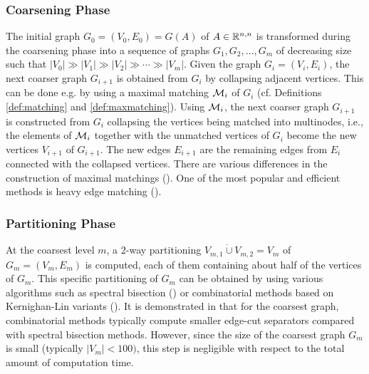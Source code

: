\subsubsection*{Coarsening Phase}
The initial graph $G_0=(V_0,E_0)=G(A)$ of $A\in\mathbb{R}^{n,n}$ is transformed during
the coarsening phase
into a sequence of graphs $G_1, G_2, \ldots, G_m$ of decreasing size 
such that $|V_0|\gg|V_1|\gg|V_2|\gg\cdots\gg|V_m|$. 
Given the graph $G_i=(V_i,E_i)$, the
next coarser graph $G_{i+1}$ is  obtained from $G_i$ by collapsing adjacent
vertices. This can be done e.g. by using a maximal matching $\mathcal{M}_i$ of $G_i$ (cf. Definitions \ref{def:matching} and \ref{def:maxmatching}).
Using $\mathcal{M}_i$, the next  coarser graph $G_{i+1}$ is 
constructed from $G_i$ collapsing the vertices 
being matched into multinodes, i.e., the elements of  $\mathcal{M}_i$ together with the
unmatched vertices of $G_i$ become the new vertices $V_{i+1}$ of $G_{i+1}$. 
The new edges $E_{i+1}$ are the remaining edges from $E_i$ 
connected with the collapsed vertices. 
There are various differences in the construction of maximal matchings
(\cite{karypis:98,CheP08}).
One of the most popular and efficient methods is heavy edge
matching (\cite{karypis:98}).

\subsubsection*{Partitioning Phase}
At the coarsest level $m$,
a $2$-way partitioning $V_{m,1}\dot{\cup}V_{m,2}=V_m$ of $G_m=(V_m,E_m)$ is computed,
each of them containing about half of the vertices of $G_m$.
This specific partitioning of $G_m$ can be obtained by using various
algorithms such as spectral bisection (\cite{fiedler:75}) or
combinatorial methods based on Kernighan-Lin variants
(\cite{KerL70,FidM97}). It is demonstrated in \cite{karypis:98} that
for the coarsest graph, combinatorial
methods typically compute smaller edge-cut separators compared with
spectral bisection methods. However, since
the size of the coarsest graph $G_m$ is small (typically $|V_m|<100)$, this
step is negligible with respect to the total amount of computation time.

